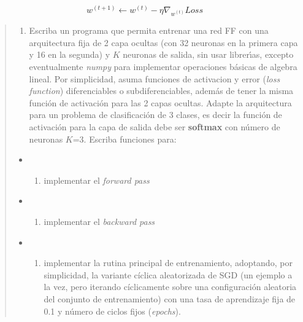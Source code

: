 \documentclass[11pt]{article}
\providecommand{\tightlist}{%
      \setlength{\itemsep}{0pt}\setlength{\parskip}{0pt}}
\begin{document}
\[ w^{(t+1)} \leftarrow w^{(t)} - \eta \nabla_{w^{(t)}} Loss \]

\begin{quote}
\begin{enumerate}
\def\labelenumi{\alph{enumi})}
\tightlist
\item
  Escriba un programa que permita entrenar una red FF con una
  arquitectura fija de 2 capa ocultas (con 32 neuronas en la primera
  capa y 16 en la segunda) y \(K\) neuronas de salida, sin usar
  librerı́as, excepto eventualmente \emph{numpy} para implementar
  operaciones básicas de algebra lineal. Por simplicidad, asuma
  funciones de activacion y error (\emph{loss function}) diferenciables
  o subdiferenciables, además de tener la misma función de activación
  para las 2 capas ocultas. Adapte la arquitectura para un problema de
  clasificación de 3 clases, es decir la función de activación para la
  capa de salida debe ser \textbf{softmax} con número de neuronas
  \(K\)=3. Escriba funciones para:\\
\end{enumerate}

\begin{itemize}
\item
  \begin{enumerate}
  \def\labelenumi{(\roman{enumi})}
  \tightlist
  \item
    implementar el \emph{forward pass}\\
  \end{enumerate}
\item
  \begin{enumerate}
  \def\labelenumi{(\roman{enumi})}
  \setcounter{enumi}{1}
  \tightlist
  \item
    implementar el \emph{backward pass}\\
  \end{enumerate}
\item
  \begin{enumerate}
  \def\labelenumi{(\roman{enumi})}
  \setcounter{enumi}{2}
  \tightlist
  \item
    implementar la rutina principal de entrenamiento, adoptando, por
    simplicidad, la variante cíclica aleatorizada de SGD (un ejemplo a
    la vez, pero iterando cíclicamente sobre una configuración aleatoria
    del conjunto de entrenamiento) con una tasa de aprendizaje fija de
    0.1 y número de ciclos fijos (\emph{epochs}).
  \end{enumerate}
\end{itemize}
\end{quote}
\end{document}
